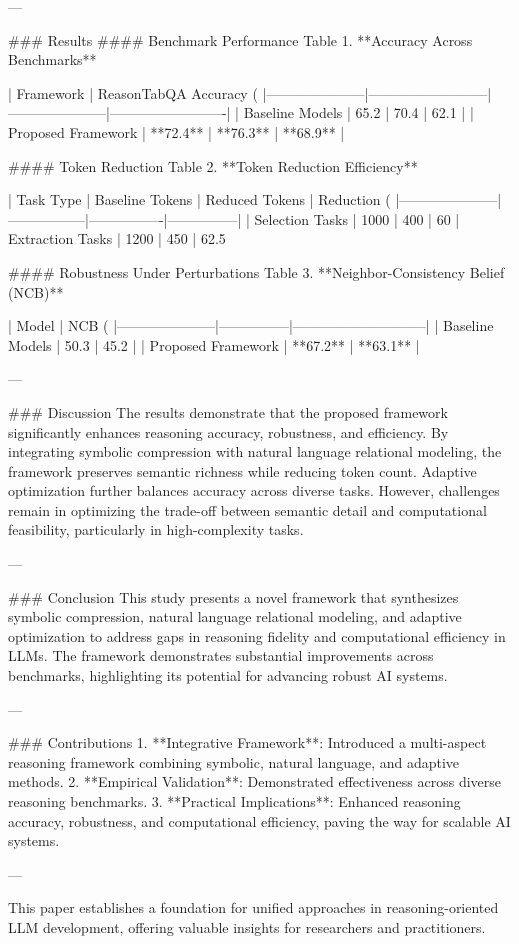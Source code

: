 ---

### Results
#### Benchmark Performance
Table 1. **Accuracy Across Benchmarks**

| Framework           | ReasonTabQA Accuracy (%
|---------------------|--------------------------|---------------------|-------------------------|
| Baseline Models     | 65.2                    | 70.4               | 62.1                   |
| Proposed Framework  | **72.4**                | **76.3**           | **68.9**               |

#### Token Reduction
Table 2. **Token Reduction Efficiency**

| Task Type           | Baseline Tokens | Reduced Tokens | Reduction (%
|---------------------|-----------------|----------------|---------------|
| Selection Tasks     | 1000            | 400            | 60%
| Extraction Tasks    | 1200            | 450            | 62.5%

#### Robustness Under Perturbations
Table 3. **Neighbor-Consistency Belief (NCB)**

| Model               | NCB (%
|---------------------|---------------|-----------------------------|
| Baseline Models     | 50.3          | 45.2                        |
| Proposed Framework  | **67.2**      | **63.1**                    |

---

### Discussion
The results demonstrate that the proposed framework significantly enhances reasoning accuracy, robustness, and efficiency. By integrating symbolic compression with natural language relational modeling, the framework preserves semantic richness while reducing token count. Adaptive optimization further balances accuracy across diverse tasks. However, challenges remain in optimizing the trade-off between semantic detail and computational feasibility, particularly in high-complexity tasks.

---

### Conclusion
This study presents a novel framework that synthesizes symbolic compression, natural language relational modeling, and adaptive optimization to address gaps in reasoning fidelity and computational efficiency in LLMs. The framework demonstrates substantial improvements across benchmarks, highlighting its potential for advancing robust AI systems.

---

### Contributions
1. **Integrative Framework**: Introduced a multi-aspect reasoning framework combining symbolic, natural language, and adaptive methods.
2. **Empirical Validation**: Demonstrated effectiveness across diverse reasoning benchmarks.
3. **Practical Implications**: Enhanced reasoning accuracy, robustness, and computational efficiency, paving the way for scalable AI systems.

--- 

This paper establishes a foundation for unified approaches in reasoning-oriented LLM development, offering valuable insights for researchers and practitioners.